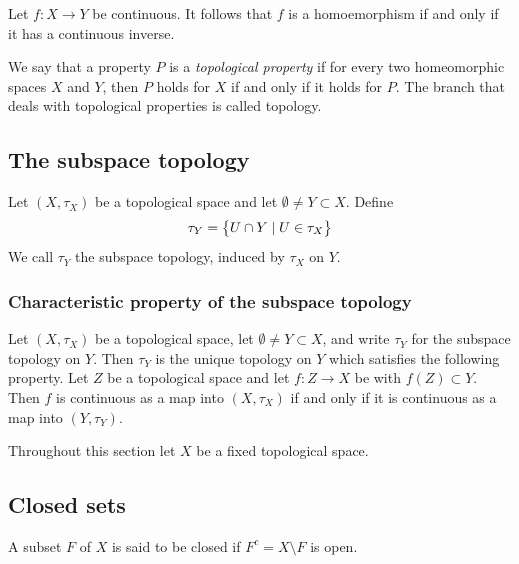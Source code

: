 \documentclass[11pt,a4paper]{article}
\begin{document}
\begin{proposition}
  Let $f \colon X \to Y$ be continuous. It follows that $f$ is a 
  homoemorphism if and only if it has a continuous inverse.
\end{proposition}

\begin{remark}
  We say that a property $P$ is a \emph{topological property} if for every
  two homeomorphic spaces $X$ and $Y$, then $P$ holds for $X$ if and only
  if it holds for $P$. The branch that deals with topological properties
  is called topology.
\end{remark}

\subsection{The subspace topology}

\begin{definition}
  Let $(X,\tau_X)$ be a topological space and let $\emptyset \neq Y \subset 
  X$. Define
  \[
    \tau_Y = \left\{U \cap Y \mid U \in \tau_X\right\}
  \]
  We call $\tau_Y$ the subspace topology, induced by $\tau_X$ on $Y$.
\end{definition}

\subsubsection{Characteristic property of the subspace topology}

\begin{theorem}
  Let $(X, \tau_X)$
  be a topological space, let $\emptyset \neq Y \subset X$, and write 
  $\tau_Y$ for the subspace topology on $Y$. Then $\tau_Y$ is the unique 
  topology on $Y$ which satisfies the following property. Let $Z$
  be a topological space and let $f \colon Z \to X$ be with 
  $f(Z) \subset Y$. Then $f$ is continuous as a map into $(X, \tau_X)$ if 
  and only if it is continuous as a map into $(Y, \tau_Y)$.
\end{theorem}

Throughout this section let $X$ be a fixed topological space.

\subsection{Closed sets}

\begin{definition}
  A subset $F$ of $X$ is said to be closed if $F^c = X \setminus F$ is open.
\end{definition}
\end{document}
